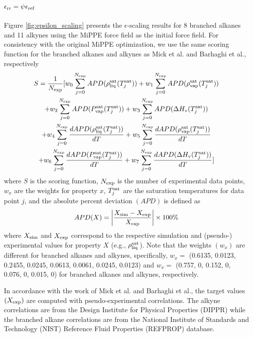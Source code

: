 \documentclass[journal=jced,manuscript=article]{achemso}
\begin{document}

\subsection{$\epsilon_{\rm rr} = \psi \epsilon_{\rm ref}$}

Figure \ref{fig:epsilon_scaling} presents the $\epsilon$-scaling results for 8 branched alkanes and 11 alkynes using the MiPPE force field as the initial force field. For consistency with the original MiPPE optimization, we use the same scoring function for the branched alkanes and alkynes as Mick et al. and Barhaghi et al., respectively
\begin{multline} \label{eq: Score}
S= \frac{1}{N_{\rm exp}} [ w_0 \sum_{j=0}^{N_{\rm exp}} APD(\rho_{\rm liq}^{\rm sat}(T^{\rm sat}_j)) + w_1 \sum_{j=0}^{N_{\rm exp}} APD(\rho_{\rm vap}^{\rm sat}(T^{\rm sat}_j)) \\ + w_2 \sum_{j=0}^{N_{\rm exp}} APD(P_{\rm vap}^{\rm sat}(T^{\rm sat}_j)) + w_3 \sum_{j=0}^{N_{\rm exp}} APD(\Delta H_{\rm v} (T^{\rm sat}_j)) \\ + w_4 \sum_{j=0}^{N_{\rm exp}} \frac{d APD(\rho_{\rm liq}^{\rm sat}(T^{\rm sat}_j))}{dT} + w_5 \sum_{j=0}^{N_{\rm exp}} \frac{d APD(\rho_{\rm vap}^{\rm sat}(T^{\rm sat}_j))}{dT} \\ + w_6 \sum_{j=0}^{N_{\rm exp}} \frac{d APD(P_{\rm vap}^{\rm sat}(T^{\rm sat}_j))}{dT} + w_7 \sum_{j=0}^{N_{\rm exp}} \frac{d APD(\Delta H_{\rm v} (T^{\rm sat}_j))}{dT} ]
\end{multline}
where $S$ is the scoring function, $N_{\rm exp}$ is the number of experimental data points, $w_{x}$ are the weights for property $x$, $T^{\rm sat}_j$ are the saturation temperatures for data point $j$, and the absolute percent deviation $(APD)$ is defined as
\begin{equation} \label{eq: APD}
APD(X) = \left| \frac{X_{\rm sim} - X_{\rm exp}}{X_{\rm exp}} \right| \times 100 \% 
\end{equation}
where $X_{\rm sim}$ and $X_{\rm exp}$ correspond to the respective simulation and (pseudo-) experimental values for property $X$ (e.g., $\rho_{\rm liq}^{\rm sat}$). Note that the weights $(w_x)$ are different for branched alkanes and alkynes, specifically, $w_x = $ (0.6135, 0.0123, 0.2455, 0.0245, 0.0613, 0.0061, 0.0245, 0.0123) and $w_x = $ (0.757, 0, 0.152, 0, 0.076, 0, 0.015, 0) for branched alkanes and alkynes, respectively.

In accordance with the work of Mick et al. and Barhaghi et al., the target values $(X_{\rm exp})$ are computed with pseudo-experimental correlations. The alkyne correlations are from the Design Institute for Physical Properties (DIPPR) while the branched alkane correlations are from the National Institute of Standards and Technology (NIST) Reference Fluid Properties (REFPROP) database.
\end{document}
